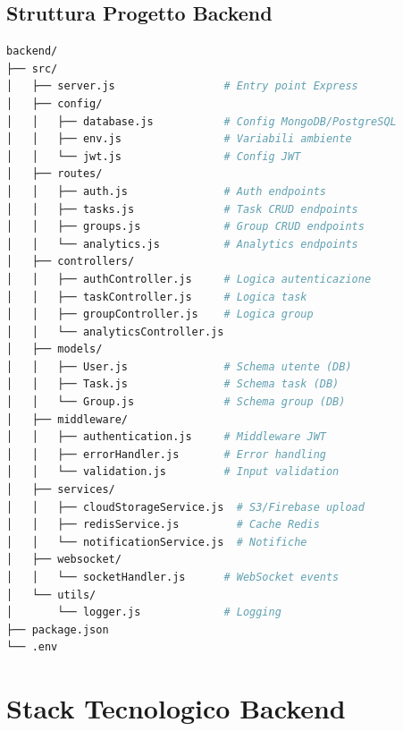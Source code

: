 \documentclass[12pt,a4paper]{report}
\begin{document}
\subsection{Struttura Progetto Backend}

\begin{lstlisting}[language=bash]
backend/
├── src/
│   ├── server.js                 # Entry point Express
│   ├── config/
│   │   ├── database.js           # Config MongoDB/PostgreSQL
│   │   ├── env.js                # Variabili ambiente
│   │   └── jwt.js                # Config JWT
│   ├── routes/
│   │   ├── auth.js               # Auth endpoints
│   │   ├── tasks.js              # Task CRUD endpoints
│   │   ├── groups.js             # Group CRUD endpoints
│   │   └── analytics.js          # Analytics endpoints
│   ├── controllers/
│   │   ├── authController.js     # Logica autenticazione
│   │   ├── taskController.js     # Logica task
│   │   ├── groupController.js    # Logica group
│   │   └── analyticsController.js
│   ├── models/
│   │   ├── User.js               # Schema utente (DB)
│   │   ├── Task.js               # Schema task (DB)
│   │   └── Group.js              # Schema group (DB)
│   ├── middleware/
│   │   ├── authentication.js     # Middleware JWT
│   │   ├── errorHandler.js       # Error handling
│   │   └── validation.js         # Input validation
│   ├── services/
│   │   ├── cloudStorageService.js  # S3/Firebase upload
│   │   ├── redisService.js         # Cache Redis
│   │   └── notificationService.js  # Notifiche
│   ├── websocket/
│   │   └── socketHandler.js      # WebSocket events
│   └── utils/
│       └── logger.js             # Logging
├── package.json
└── .env
\end{lstlisting}

\section{Stack Tecnologico Backend}
\end{document}
